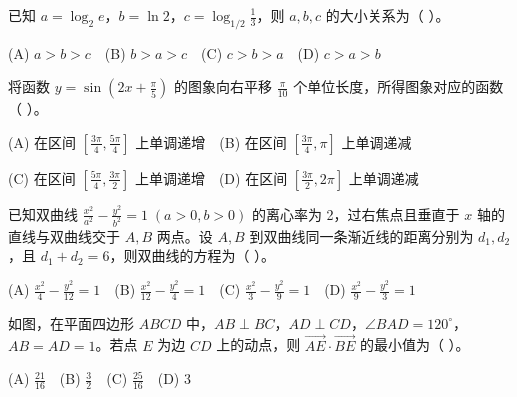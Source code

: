 \begin{question}
已知 $a=\log_2 e$，$b=\ln2$，$c=\log_{1/2}\frac13$，则 $a,b,c$ 的大小关系为（ ）。

(A) $a>b>c$　(B) $b>a>c$　(C) $c>b>a$　(D) $c>a>b$

\end{question}
\begin{question}
将函数 $y=\sin\left(2x+\frac\pi5\right)$ 的图象向右平移 $\frac\pi{10}$ 个单位长度，所得图象对应的函数（ ）。

(A) 在区间 $\left[\frac{3\pi}4,\frac{5\pi}4\right]$ 上单调递增　(B) 在区间 $\left[\frac{3\pi}4,\pi\right]$ 上单调递减

(C) 在区间 $\left[\frac{5\pi}4,\frac{3\pi}2\right]$ 上单调递增　(D) 在区间 $\left[\frac{3\pi}2,2\pi\right]$ 上单调递减

\end{question}
\begin{question}
已知双曲线 $\frac{x^2}{a^2}-\frac{y^2}{b^2}=1\;(a>0,b>0)$ 的离心率为 2，过右焦点且垂直于 $x$ 轴的直线与双曲线交于 $A,B$ 两点。设 $A,B$ 到双曲线同一条渐近线的距离分别为 $d_1,d_2$，且 $d_1+d_2=6$，则双曲线的方程为（ ）。

(A) $\frac{x^2}{4}-\frac{y^2}{12}=1$　(B) $\frac{x^2}{12}-\frac{y^2}{4}=1$　(C) $\frac{x^2}{3}-\frac{y^2}{9}=1$　(D) $\frac{x^2}{9}-\frac{y^2}{3}=1$

\Needspace{0.4\textheight}
\end{question}
\begin{question}
如图，在平面四边形 $ABCD$ 中，$AB\perp BC$，$AD\perp CD$，$\angle BAD=120^\circ$，$AB=AD=1$。若点 $E$ 为边 $CD$ 上的动点，则 $\overrightarrow{AE}\cdot\overrightarrow{BE}$ 的最小值为（ ）。
\nopagebreak[4]
\begin{center}\end{center}
\nopagebreak[4]
(A) $\frac{21}{16}$　(B) $\frac32$　(C) $\frac{25}{16}$　(D) $3$

\end{question}

